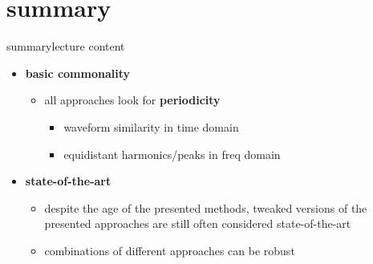     \section{summary}
        \begin{frame}{summary}{lecture content}
            \begin{itemize}
                \item   \textbf{basic commonality}
                    \begin{itemize}
                        \item   all approaches look for \textbf{periodicity}
                            \begin{itemize}
                                \item   waveform similarity in time domain
                                \item   equidistant harmonics/peaks in freq domain
                            \end{itemize}
                    \end{itemize}
                \bigskip
                \item   \textbf{state-of-the-art}
                    \begin{itemize}
                        \item   despite the age of the presented methods, tweaked versions of the presented approaches are still often considered state-of-the-art
                        \item   combinations of different approaches can be robust
                    \end{itemize}
            \end{itemize}
        \end{frame}

